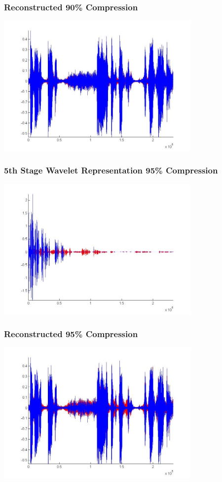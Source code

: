 \documentclass[10pt]{beamer}
\begin{document}
\begin{frame}
\frametitle{Reconstructed 90\% Compression}
\includegraphics[height=7cm]{reConstructp9}
\end{frame}

\begin{frame}
\frametitle{5th Stage Wavelet Representation  95\% Compression}
\includegraphics[height=7cm]{stage4p95}
\end{frame}

\begin{frame}
\frametitle{Reconstructed 95\% Compression}
\includegraphics[height=7cm]{reConstructp95}
\end{frame}
\end{document}
